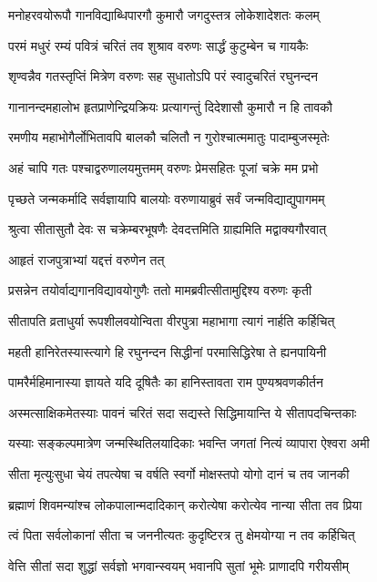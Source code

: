 \twolineshloka
{मनोहरवयोरूपौ गानविद्याब्धिपारगौ}
{कुमारौ जगदुस्तत्र लोकेशादेशतः कलम्}%

\twolineshloka
{परमं मधुरं रम्यं पवित्रं चरितं तव}
{शुश्राव वरुणः सार्द्धं कुटुम्बेन च गायकैः}%

\twolineshloka
{शृण्वन्नैव गतस्तृप्तिं मित्रेण वरुणः सह}
{सुधातोऽपि परं स्वादुचरितं रघुनन्दन}%

\twolineshloka
{गानानन्दमहालोभ हृतप्राणेन्द्रियक्रियः}
{प्रत्यागन्तुं दिदेशासौ कुमारौ न हि तावकौ}%

\twolineshloka
{रमणीय महाभोगैर्लोभितावपि बालकौ}
{चलितौ न गुरोश्चात्ममातुः पादाम्बुजस्मृतेः}%

\twolineshloka
{अहं चापि गतः पश्चाद्वरुणालयमुत्तमम्}
{वरुणः प्रेमसहितः पूजां चक्रे मम प्रभो}%

\twolineshloka
{पृच्छते जन्मकर्मादि सर्वज्ञायापि बालयोः}
{वरुणायाब्रुवं सर्वं जन्मविद्याद्युपागमम्}%

\twolineshloka
{श्रुत्वा सीतासुतौ देवः स चक्रेम्बरभूषणैः}
{देवदत्तमिति ग्राह्यमिति मद्वाक्यगौरवात्}%

आहृतं राजपुत्राभ्यां यद्दत्तं वरुणेन तत्

\twolineshloka
{प्रसन्नेन तयोर्वाद्यगानविद्यावयोगुणैः}
{ततो मामब्रवीत्सीतामुद्दिश्य वरुणः कृती}%

\twolineshloka
{सीतापति व्रताधुर्या रूपशीलवयोन्विता}
{वीरपुत्रा महाभागा त्यागं नार्हति कर्हिचित्}%

\twolineshloka
{महती हानिरेतस्यास्त्यागे हि रघुनन्दन}
{सिद्धीनां परमासिद्धिरेषा ते ह्यनपायिनी}%

\twolineshloka
{पामरैर्महिमानास्या ज्ञायते यदि दूषितैः}
{का हानिस्तावता राम पुण्यश्रवणकीर्तन}%

\twolineshloka
{अस्मत्साक्षिकमेतस्याः पावनं चरितं सदा}
{सद्यस्ते सिद्धिमायान्ति ये सीतापदचिन्तकाः}%

\twolineshloka
{यस्याः सङ्कल्पमात्रेण जन्मस्थितिलयादिकाः}
{भवन्ति जगतां नित्यं व्यापारा ऐश्वरा अमी}%

\twolineshloka
{सीता मृत्युःसुधा चेयं तपत्येषा च वर्षति}
{स्वर्गो मोक्षस्तपो योगो दानं च तव जानकी}%

\twolineshloka
{ब्रह्माणं शिवमन्यांश्च लोकपालान्मदादिकान्}
{करोत्येषा करोत्येव नान्या सीता तव प्रिया}%

\twolineshloka
{त्वं पिता सर्वलोकानां सीता च जननीत्यतः}
{कुदृष्टिरत्र तु क्षेमयोग्या न तव कर्हिचित्}%

\twolineshloka
{वेत्ति सीतां सदा शुद्धां सर्वज्ञो भगवान्स्वयम्}
{भवानपि सुतां भूमेः प्राणादपि गरीयसीम्}%

